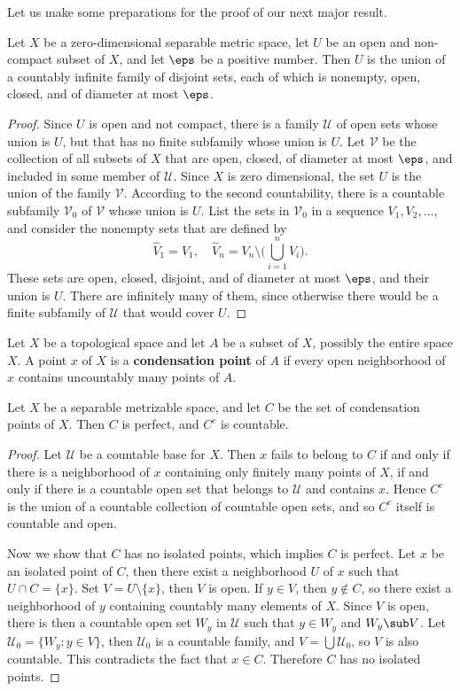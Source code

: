 Let us make some preparations for the proof of our next major result.
\begin{lemma}\label{metric separable dim=0 noncompact}
Let $X$ be a zero-dimensional separable metric space, let $U$ be an open and non-compact subset of $X$, and let $\eps$ be a positive number. Then $U$ is the union of a countably infinite family of disjoint sets, each of which is nonempty, open, closed, and of diameter at most $\eps$.
\end{lemma}
\begin{proof}
Since $U$ is open and not compact, there is a family $\mathcal{U}$ of open sets whose union is $U$, but that has no finite subfamily whose union is $U$. Let $\mathcal{V}$ be the collection of all subsets of $X$ that are open, closed, of diameter at most $\eps$, and included in some member of $\mathcal{U}$. Since $X$ is zero dimensional, the set $U$ is the union of the family $\mathcal{V}$. According to the second countability, there is a countable subfamily $\mathcal{V}_0$ of $\mathcal{V}$ whose union is $U$. List the sets in $\mathcal{V}_0$ in a sequence $V_1,V_2,\dots$, and consider the nonempty sets that are defined by
\[\widehat{V}_1=V_1,\quad\widehat{V}_n=V_n\setminus\Big(\bigcup_{i=1}^{n}V_i\Big).\]
These sets are open, closed, disjoint, and of diameter at most $\eps$, and their union is $U$. There are infinitely many of them, since otherwise there would be a finite subfamily of $\mathcal{U}$ that would cover $U$.
\end{proof}
Let $X$ be a topological space and let $A$ be a subset of $X$, possibly the entire space $X$. A point $x$ of $X$ is a \textbf{condensation point} of $A$ if every open neighborhood of $x$ contains uncountably many points of $A$.
\begin{lemma}\label{metric space condensation point}
Let $X$ be a separable metrizable space, and let $C$ be the set of condensation points of $X$. Then $C$ is perfect, and $C^c$ is countable.
\end{lemma}
\begin{proof}
Let $\mathcal{U}$ be a countable base for $X$. Then $x$ fails to belong to $C$ if and only if there is a neighborhood of $x$ containing only finitely many points of $X$, if and only if there is a countable open set that belongs to $\mathcal{U}$ and contains $x$. Hence $C^c$ is the union of a countable collection of countable open sets, and so $C^c$ itself is countable and open.\par
Now we show that $C$ has no isolated points, which implies $C$ is perfect. Let $x$ be an isolated point of $C$, then there exist a neighborhood $U$ of $x$ such that $U\cap C=\{x\}$. Set $V=U\setminus\{x\}$, then $V$ is open. If $y\in V$, then $y\notin C$, so there exist a neighborhood of $y$ containing countably many elements of $X$. Since $V$ is open, there is then a countable open set $W_y$ in $\mathcal{U}$ such that $y\in W_y$ and $W_y\sub V$. Let $\mathcal{U}_0=\{W_y:y\in V\}$, then $\mathcal{U}_0$ is a countable family, and $V=\bigcup\mathcal{U}_0$, so $V$ is also countable. This contradicts the fact that $x\in C$. Therefore $C$ has no isolated points. 
\end{proof}
